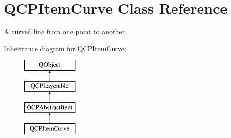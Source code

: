 \hypertarget{classQCPItemCurve}{}\section{Q\+C\+P\+Item\+Curve Class Reference}
\label{classQCPItemCurve}


A curved line from one point to another.  


Inheritance diagram for Q\+C\+P\+Item\+Curve\+:\begin{figure}[H]
\begin{center}
\leavevmode
\includegraphics[height=4.000000cm]{classQCPItemCurve}
\end{center}
\end{figure}
